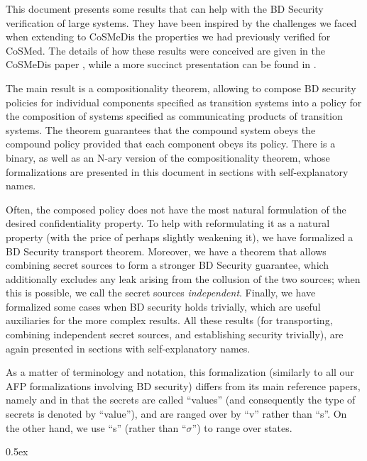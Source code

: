 \documentclass[11pt,a4paper]{article}
\begin{document}
This document presents some results that can help with the BD Security verification of large systems. They have been inspired by the challenges we faced when extending to CoSMeDis
 the properties we had previously verified for CoSMed.
  The details of how these results were conceived  are given in the CoSMeDis paper \cite{cosmedis-SandP2017}, while a more succinct presentation can be found in \cite{BDsecurity-ITP2021}. %

The main result is a compositionality theorem, allowing to compose
	BD security policies for individual components specified as transition systems
	into a policy for the composition of systems specified as communicating products of transition systems. The theorem guarantees that the compound system obeys the compound policy provided that each component obeys its policy.
%
There is a binary, as well as an N-ary version of the compositionality theorem, whose formalizations are presented in this document in sections with self-explanatory names.

Often, the composed policy does not have the most natural formulation of the desired confidentiality property. To help with reformulating it as a natural property (with the price of perhaps slightly weakening it), we have formalized a BD Security transport theorem.
%
Moreover, we have a theorem that allows combining secret sources to form a stronger BD Security guarantee, which additionally excludes any leak arising from the collusion of the two sources; when this is possible, we call the secret sources \emph{independent}.
%
Finally, we have formalized some cases when BD security holds trivially, which
are useful auxiliaries for the more complex results.
%
All these results (for transporting, combining independent secret sources, and establishing security trivially), are again presented in sections with self-explanatory names.

As a matter of terminology and notation, this formalization (similarly to all our AFP formalizations involving BD security)
differs from its main reference papers, namely \cite{cosmedis-SandP2017}  and \cite{BDsecurity-ITP2021}
in
that the secrets are called ``values'' (and consequently the type of secrets is
denoted by ``value''), and are ranged over by ``v'' rather than ``s''. On the other
hand, we use ``s'' (rather than ``$\sigma$'') to range over states.



\parindent 0pt\parskip 0.5ex





\end{document}
